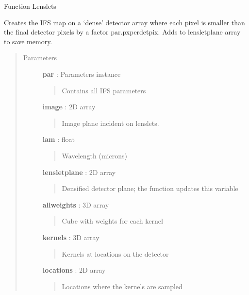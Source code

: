 \documentclass[letterpaper,10pt,english]{sphinxmanual}
\begin{document}
\begin{fulllineitems}
\label{tools:tools.lenslet.Lenslets}
Function Lenslets

Creates the IFS map on a `dense' detector array where each pixel is smaller than the
final detector pixels by a factor par.pxperdetpix. Adds to lensletplane array to save
memory.
\begin{quote}\begin{description}
\item[{Parameters}] \leavevmode
\textbf{par} :   Parameters instance
\begin{quote}

Contains all IFS parameters
\end{quote}

\textbf{image} : 2D array
\begin{quote}

Image plane incident on lenslets.
\end{quote}

\textbf{lam} : float
\begin{quote}

Wavelength (microns)
\end{quote}

\textbf{lensletplane} : 2D array
\begin{quote}

Densified detector plane; the function updates this variable
\end{quote}

\textbf{allweights} : 3D array
\begin{quote}

Cube with weights for each kernel
\end{quote}

\textbf{kernels} : 3D array
\begin{quote}

Kernels at locations on the detector
\end{quote}

\textbf{locations} : 2D array
\begin{quote}

Locations where the kernels are sampled
\end{quote}

\end{description}\end{quote}

\end{fulllineitems}
\end{document}
